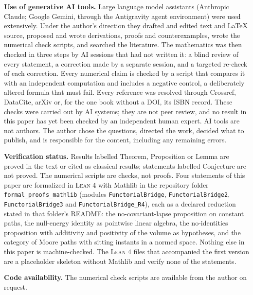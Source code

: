 \documentclass[11pt,a4paper,reqno]{amsart}
\theoremstyle{definition}
\numberwithin{equation}{section}
\begin{document}
\medskip\noindent\textbf{Use of generative AI tools.} Large language model
assistants (Anthropic Claude; Google Gemini, through the Antigravity agent
environment) were used extensively. Under the author's direction they drafted and
edited text and \LaTeX{} source, proposed and wrote derivations, proofs and
counterexamples, wrote the numerical check scripts, and searched the literature.
The mathematics was then checked in three steps by AI sessions that had not
written it: a blind review of every statement, a correction made by a separate
session, and a targeted re-check of each correction. Every numerical claim is
checked by a script that compares it with an independent computation and includes
a negative control, a deliberately altered formula that must fail. Every reference
was resolved through Crossref, DataCite, arXiv or, for the one book without a DOI, its ISBN record. These checks were carried out by
AI systems; they are not peer review, and no result in this paper has yet
been checked by an independent human expert. AI tools are not authors. The author
chose the questions, directed the work, decided what to publish, and is
responsible for the content, including any remaining errors.

\medskip\noindent\textbf{Verification status.} Results labelled Theorem,
Proposition or Lemma are proved in the text or cited as classical results;
statements labelled Conjecture are not proved. The numerical scripts are checks,
not proofs. Four statements of this paper are formalized in \textsc{Lean 4} with Mathlib in the repository folder \texttt{formal\_proofs\_mathlib} (modules \texttt{FunctorialBridge}, \texttt{FunctorialBridge2}, \texttt{FunctorialBridge3} and \texttt{FunctorialBridge\_R4}), each as a declared reduction stated in that folder's README: the no-covariant-lapse proposition on constant paths, the null-energy identity as pointwise linear algebra, the no-identities proposition with additivity and positivity of the volume as hypotheses, and the category of Moore paths with sitting instants in a normed space. Nothing else in this paper is machine-checked. The \textsc{Lean 4} files that accompanied the first version are a placeholder skeleton without Mathlib and verify none of the
statements.

\medskip\noindent\textbf{Code availability.} The numerical check scripts are
available from the author on request.
\end{document}
